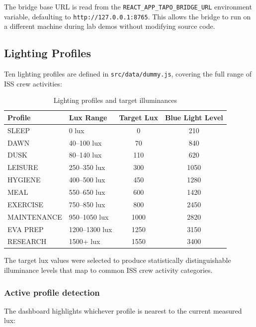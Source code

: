 \documentclass[12pt,letterpaper]{article}
\begin{document}
The bridge base URL is read from the \texttt{REACT\_APP\_TAPO\_BRIDGE\_URL}
environment variable, defaulting to \texttt{http://127.0.0.1:8765}. This
allows the bridge to run on a different machine during lab demos without
modifying source code.

\subsection{Lighting Profiles}

Ten lighting profiles are defined in \texttt{src/data/dummy.js}, covering the
full range of ISS crew activities:

\begin{table}[H]
  \centering
  \caption{Lighting profiles and target illuminances}
  \label{tab:profiles}
  \begin{tabular}{llcc}
    \toprule
    \textbf{Profile} & \textbf{Lux Range} & \textbf{Target Lux} & \textbf{Blue Light Level} \\
    \midrule
    SLEEP    & 0 lux         &    0  &  210 \\
    DAWN     & 40–100 lux    &   70  &  840 \\
    DUSK     & 80–140 lux    &  110  &  620 \\
    LEISURE  & 250–350 lux   &  300  & 1050 \\
    HYGIENE  & 400–500 lux   &  450  & 1280 \\
    MEAL     & 550–650 lux   &  600  & 1420 \\
    EXERCISE & 750–850 lux   &  800  & 2450 \\
    MAINTENANCE & 950–1050 lux & 1000 & 2820 \\
    EVA PREP & 1200–1300 lux & 1250  & 3150 \\
    RESEARCH & 1500+ lux     & 1550  & 3400 \\
    \bottomrule
  \end{tabular}
\end{table}

The target lux values were selected to produce statistically distinguishable
illuminance levels that map to common ISS crew activity categories.

\subsubsection{Active profile detection}

The dashboard highlights whichever profile is nearest to the current measured
lux:
\end{document}

